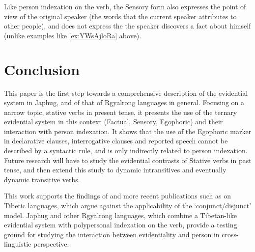 \documentclass[oldfontcommands,oneside,a4paper,11pt]{article}
\begin{document}
Like person indexation on the verb, the Sensory form also expresses the point of view of the original speaker (the words that the current speaker attributes to other people), and does not express the the speaker discovers a fact about himself (unlike examples like \ref{ex:YWsAjloRa} above).

\section*{Conclusion}
This paper is the first step towards a comprehensive description of the evidential system in Japhug, and of that of Rgyalrong languages in general. Focusing on a narrow topic, stative verbs in present tense, it presents the use of the ternary evidential system in this context (Factual, Sensory, Egophoric) and their interaction with person indexation. It shows that the use of the Egophoric marker in declarative clauses, interrogative clauses and reported speech cannot be described by a syntactic rule, and is only indirectly related to person indexation. Future research will have to study the evidential contrasts of Stative verbs in past tense, and then extend this study to dynamic intransitives and eventually dynamic transitive verbs.

This work supports the findings of \citet{tournadre08conjunct} and more recent publications such as \citet{hill17evidential} on Tibetic languages, which argue against the applicability of the `conjunct/disjunct' model. Japhug and other Rgyalrong languages, which combine a Tibetan-like evidential system with polypersonal indexation on the verb, provide a testing ground for studying the interaction between evidentiality and person in cross-linguistic perspective.



\end{document}
